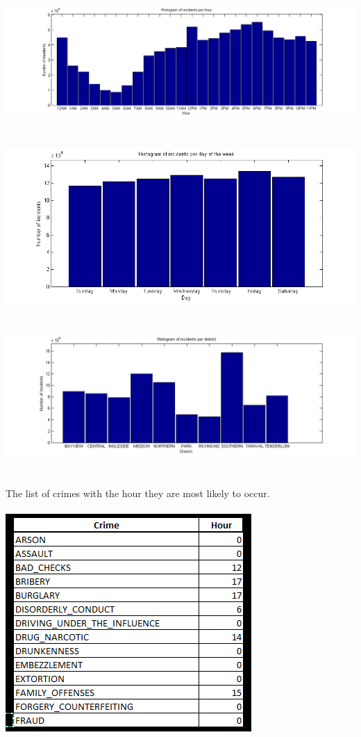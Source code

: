 \documentclass[paper=a4, fontsize=11pt]{scrartcl} %
\numberwithin{equation}{section} %
\numberwithin{figure}{section} %
\numberwithin{table}{section} %
\begin{document}
	\hspace*{-4cm}\includegraphics[scale=0.7]{histogram_hours}
	\\\\\\
	\includegraphics[scale=0.7]{histogram_days}
	\\\\\\
	\hspace*{-3cm}\includegraphics[scale=0.7]{histogram_district}
	\\\\\\
	The list of crimes with the hour they are most likely to occur.\\\\
	\includegraphics{crimes_hours}
\end{document}
